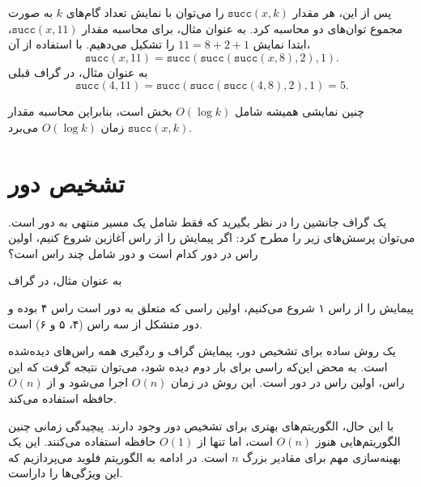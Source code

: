 پس از این، هر مقدار $\texttt{succ}(x,k)$ را می‌توان با نمایش تعداد گام‌های $k$ به صورت مجموع توان‌های دو محاسبه کرد.
به عنوان مثال، برای محاسبه مقدار $\texttt{succ}(x,11)$،
ابتدا نمایش $11=8+2+1$ را تشکیل می‌دهیم.
با استفاده از آن،
\[\texttt{succ}(x,11)=\texttt{succ}(\texttt{succ}(\texttt{succ}(x,8),2),1).\]
به عنوان مثال، در گراف قبلی
\[\texttt{succ}(4,11)=\texttt{succ}(\texttt{succ}(\texttt{succ}(4,8),2),1)=5.\]

چنین نمایشی همیشه شامل $O(\log k)$ بخش است، بنابراین محاسبه مقدار $\texttt{succ}(x,k)$
زمان $O(\log k)$ می‌برد.

\section{تشخیص دور}


یک گراف جانشین را در نظر بگیرید که فقط شامل یک مسیر منتهی به دور است.
می‌توان پرسش‌های زیر را مطرح کرد:
اگر پیمایش را از راس آغازین شروع کنیم،
اولین راس در دور کدام است
و دور شامل چند راس است؟

به عنوان مثال، در گراف

\begin{center}
\end{center}
پیمایش را از راس ۱ شروع می‌کنیم،
اولین راسی که متعلق به دور است راس ۴ بوده و دور متشکل از سه راس (۴، ۵ و ۶) است.

یک روش ساده برای تشخیص دور، پیمایش گراف و ردگیری همه راس‌های دیده‌شده است.
به محض این‌که راسی برای بار دوم دیده شود، می‌توان نتیجه گرفت
که این راس، اولین راس در دور است.
این روش در زمان $O(n)$ اجرا می‌شود و از $O(n)$ حافظه استفاده می‌کند.

با این حال، الگوریتم‌های بهتری برای تشخیص دور وجود دارند.
پیچیدگی زمانی چنین الگوریتم‌هایی هنوز $O(n)$ است،
اما تنها از $O(1)$ حافظه استفاده می‌کنند.
این یک بهینه‌سازی مهم برای مقادیر بزرگ $n$ است.
در ادامه به الگوریتم فلوید می‌پردازیم که این ویژگی‌ها را داراست.

